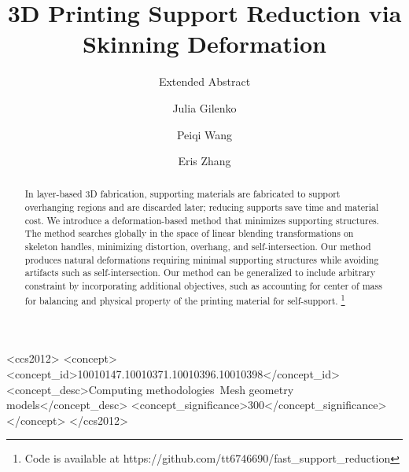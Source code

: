 \documentclass[sigconf]{acmart}
\begin{document}
\title{3D Printing Support Reduction via Skinning Deformation}
\subtitle{Extended Abstract}

\author{Julia Gilenko}

\author{Peiqi Wang}

\author{Eris Zhang}

\renewcommand{\shortauthors}{Julia G. Mark W. Eris Z.}

\begin{abstract}
 
In layer-based 3D fabrication, supporting materials are fabricated to support overhanging regions and are discarded later; reducing supports save time and material cost. We introduce a deformation-based method that minimizes supporting structures. The method searches globally in the space of linear blending transformations on skeleton handles, minimizing distortion, overhang, and self-intersection. Our method produces natural deformations requiring minimal supporting structures while avoiding artifacts such as self-intersection. Our method can be generalized to include arbitrary constraint by incorporating additional objectives, such as accounting for center of mass for balancing and physical property of the printing material for self-support. \footnote{Code is available at https://github.com/tt6746690/fast\_support\_reduction}
\end{abstract}

%
%
\begin{CCSXML}
    <ccs2012>
    <concept>
    <concept_id>10010147.10010371.10010396.10010398</concept_id>
    <concept_desc>Computing methodologies~Mesh geometry models</concept_desc>
    <concept_significance>300</concept_significance>
    </concept>
    </ccs2012>
\end{CCSXML}


\end{document}
